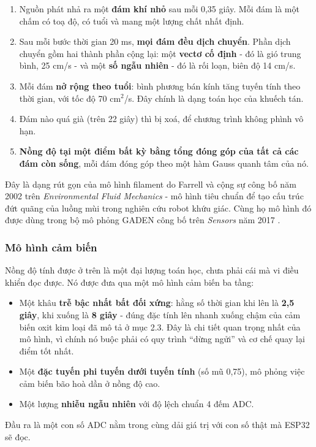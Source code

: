\begin{enumerate}[leftmargin=1.6em,itemsep=0.15em,topsep=0.3em]
  \item Nguồn phát nhả ra một \textbf{đám khí nhỏ} sau mỗi 0,35 giây. Mỗi đám là một chấm có toạ độ, có tuổi và mang một lượng chất nhất định.
  \item Sau mỗi bước thời gian 20 ms, \textbf{mọi đám đều dịch chuyển}. Phần dịch chuyển gồm hai thành phần cộng lại: một \textbf{vectơ cố định} - đó là gió trung bình, 25 cm/s - và một \textbf{số ngẫu nhiên} - đó là rối loạn, biên độ 14 cm/s.
  \item Mỗi đám \textbf{nở rộng theo tuổi}: bình phương bán kính tăng tuyến tính theo thời gian, với tốc độ 70 cm$^{2}$/s. Đây chính là dạng toán học của khuếch tán.
  \item Đám nào quá già (trên 22 giây) thì bị xoá, để chương trình không phình vô hạn.
  \item \textbf{Nồng độ tại một điểm bất kỳ bằng tổng đóng góp của tất cả các đám còn sống}, mỗi đám đóng góp theo một hàm Gauss quanh tâm của nó.
\end{enumerate}
Đây là dạng rút gọn của mô hình filament do Farrell và cộng sự công bố năm 2002 trên \textit{Environmental Fluid Mechanics} \cite{r2} - mô hình tiêu chuẩn để tạo cấu trúc đứt quãng của luồng mùi trong nghiên cứu robot khứu giác. Cùng họ mô hình đó được dùng trong bộ mô phỏng GADEN công bố trên \textit{Sensors} năm 2017 \cite{r4}.

\subsubsection{Mô hình cảm biến}
Nồng độ tính được ở trên là một đại lượng toán học, chưa phải cái mà vi điều khiển đọc được. Nó được đưa qua một mô hình cảm biến ba tầng:

\begin{itemize}[leftmargin=1.4em,itemsep=0.15em,topsep=0.3em]
  \item Một khâu \textbf{trễ bậc nhất bất đối xứng}: hằng số thời gian khi lên là \textbf{2,5 giây}, khi xuống là \textbf{8 giây} - đúng đặc tính lên nhanh xuống chậm của cảm biến oxit kim loại đã mô tả ở mục 2.3. Đây là chi tiết quan trọng nhất của mô hình, vì chính nó buộc phải có quy trình ``dừng ngửi'' và cơ chế quay lại điểm tốt nhất.
  \item Một \textbf{đặc tuyến phi tuyến dưới tuyến tính} (số mũ 0,75), mô phỏng việc cảm biến bão hoà dần ở nồng độ cao.
  \item Một lượng \textbf{nhiễu ngẫu nhiên} với độ lệch chuẩn 4 đếm ADC.
\end{itemize}
Đầu ra là một con số ADC nằm trong cùng dải giá trị với con số thật mà ESP32 sẽ đọc.


